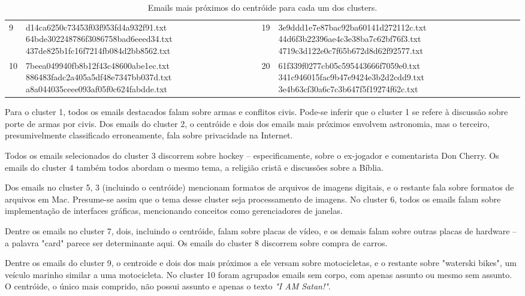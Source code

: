 \documentclass[10pt,twocolumn,letterpaper]{article}
\begin{document}
\begin{table}
\begin{center}
\begin{tabular}{ | l | l || l | l | p{8cm} |}
9 & \parbox[c][1.5cm]{6cm}{d14ca6250c73453f03f953fd4a932f91.txt 64bde302248786f3086758bad6eeed34.txt 437de825b1fc16f7214fb084d2bb8562.txt} & 19 & \parbox[c][1.5cm]{6cm}{3e9ddd1e7e87bac92ba60141d272112c.txt 44d6f3b22396ae4c3e38ba7c62bf76f3.txt 4719c3d122e0c7f65b672d8d62f92577.txt} \\
10 & \parbox[c][1.5cm]{6cm}{7beea049940fb8b12f43c48600abe1ec.txt 886483fadc2a405a5df48e7347bb037d.txt a8a044035ceee093af05f0c624fabdde.txt} & 20 & \parbox[c][1.5cm]{6cm}{61f339f0277cb05c595443666f7059e0.txt 341c946015fac9b47e9424e3b2d2cdd9.txt 3e4b63cf30a6c7c3b647f5f19274f62c.txt}  \\
\hline
\end{tabular}
\end{center}
\caption{Emails mais próximos do centróide para cada um dos clusters.}
\label{tbl-closest}
\end{table}

Para o cluster 1, todos os emails destacados falam sobre armas e conflitos civis. Pode-se inferir que o cluster 1 se refere à discussão sobre porte de armas por civis. Dos emails do cluster 2, o centróide e dois dos emails mais próximos envolvem astronomia, mas o terceiro, presumivelmente classificado erroneamente, fala sobre privacidade na Internet.

Todos os emails selecionados do cluster 3 discorrem sobre hockey -- especificamente, sobre o ex-jogador e comentarista Don Cherry. Os emails do cluster 4 também todos abordam o mesmo tema, a religião cristã e discussões sobre a Bíblia.

Dos emails no cluster 5, 3 (incluindo o centróide) mencionam formatos de arquivos de imagens digitais, e o restante fala sobre formatos de arquivos em Mac. Presume-se assim que o tema desse cluster seja processamento de imagens. No cluster 6, todos os emails falam sobre implementação de interfaces gráficas, mencionando conceitos como gerenciadores de janelas.

Dentre os emails no cluster 7, dois, incluindo o centróide, falam sobre placas de vídeo, e os demais falam sobre outras placas de hardware -- a palavra "card" parece ser determinante aqui. Os emails do cluster 8 discorrem sobre compra de carros.

Dentre os emails do cluster 9, o centroide e dois dos mais próximos a ele versam sobre motocicletas, e o restante sobre "waterski bikes", um veículo marinho similar a uma motocicleta. No cluster 10 foram agrupados emails sem corpo, com apenas assunto ou mesmo sem assunto. O centróide, o único mais comprido, não possui assunto e apenas o texto \emph{"I AM Satan!"}.
\end{document}
